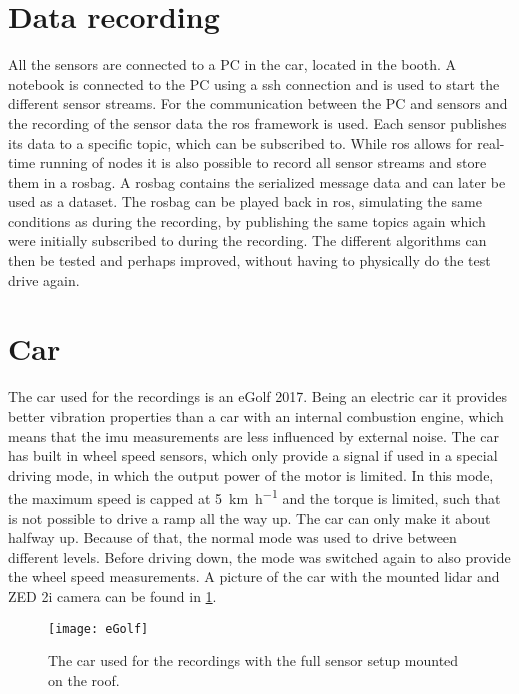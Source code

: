 \section{Data recording}
All the sensors are connected to a PC in the car, located in the booth.
A notebook is connected to the PC using a \gls{ssh} connection and is used to start the different sensor streams.
For the communication between the PC and sensors and the recording of the sensor data the \gls{ros} framework is used.
Each sensor publishes its data to a specific topic, which can be subscribed to.
While \gls{ros} allows for real-time running of nodes it is also possible to record all sensor streams and store them in a rosbag.
A rosbag contains the serialized message data and can later be used as a dataset.
The rosbag can be played back in \gls{ros}, simulating the same conditions as during the recording, by publishing the same topics again which were initially subscribed to during the recording.
The different algorithms can then be tested and perhaps improved, without having to physically do the test drive again.


\section{Car}
\label{sec:car}
The car used for the recordings is an eGolf 2017.
Being an electric car it provides better vibration properties than a car with an internal combustion engine, which means that the \gls{imu} measurements are less influenced by external noise.
The car has built in wheel speed sensors, which only provide a signal if used in a special driving mode, in which the output power of the motor is limited.
In this mode, the maximum speed is capped at \SI{5}{\kilo\metre\per\hour} and the torque is limited, such that is not possible to drive a ramp all the way up.
The car can only make it about halfway up.
Because of that, the normal mode was used to drive between different levels.
Before driving down, the mode was switched again to also provide the wheel speed measurements.
A picture of the car with the mounted \gls{lidar} and ZED 2i camera can be found in \cref{fig:eGolf}.
\begin{figure}[htb]
	\centering
	\texttt{[image: eGolf]}
	\caption[Car with mounted sensors]{The car used for the recordings with the full sensor setup mounted on the roof.}
	\label{fig:eGolf}
\end{figure}



